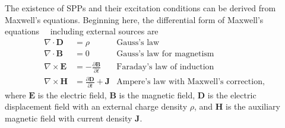 The existence of SPPs and their excitation conditions
can be derived from Maxwell's equations.  Beginning here, the differential form of
Maxwell's equations~\cite{maier2007plasmonics}~\cite{benson2009elements}
including external sources are
\begin{align}
\nabla \cdot \mathbf{D} &= \rho & \text{Gauss's law} \label{eqn:gausslaw}\\
\nabla \cdot \mathbf{B} &= 0 & \text{Gauss's law for magnetism} \label{eqn:gausslawmagnetism}\\
\nabla \times \mathbf{E} &= -\frac{\partial \mathbf{B}} {\partial t}
& \text{Faraday's law of induction} \label{eqn:faradayslaw} \\
\nabla \times \mathbf{H} &= \frac{\partial \mathbf{D}} {\partial
t} + \mathbf{J}  & \text{Ampere's law with Maxwell's correction},
\label{eqn:ampereslaw}
\end{align}
where $\mathbf{E}$ is the electric field, $\mathbf{B}$ is the magnetic
field, $\mathbf{D}$ is the electric displacement field with an external
charge density $\rho$, and $\mathbf{H}$ is the auxiliary magnetic field
with current density $\mathbf{J}$.

